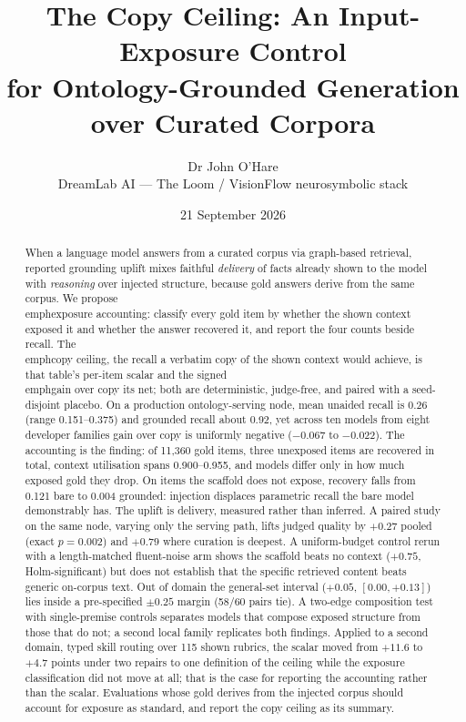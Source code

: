 \documentclass[10pt,twocolumn]{article}
\title{\vspace{-1.2cm}\bfseries The Copy Ceiling: An Input-Exposure Control\\
for Ontology-Grounded Generation over Curated Corpora}
\author{Dr John O'Hare\\ \small DreamLab AI --- The Loom / VisionFlow neurosymbolic stack}
\date{21 September 2026}
\begin{document}
\maketitle

\begin{abstract}
\noindent
When a language model answers from a curated corpus via graph-based retrieval, reported grounding uplift mixes faithful \emph{delivery} of facts already shown to the model with \emph{reasoning} over injected structure, because gold answers derive from the same corpus. We propose \\emph{exposure accounting}: classify every gold item by whether the shown context exposed it and whether the answer recovered it, and report the four counts beside recall. The \\emph{copy ceiling}, the recall a verbatim copy of the shown context would achieve, is that table's per-item scalar and the signed \\emph{gain over copy} its net; both are deterministic, judge-free, and paired with a seed-disjoint placebo. On a production ontology-serving node, mean unaided recall is 0.26 (range 0.151--0.375) and grounded recall about 0.92, yet across ten models from eight developer families gain over copy is uniformly negative ($-0.067$ to $-0.022$). The accounting is the finding: of 11{,}360 gold items, three unexposed items are recovered in total, context utilisation spans 0.900--0.955, and models differ only in how much exposed gold they drop. On items the scaffold does not expose, recovery falls from 0.121 bare to 0.004 grounded: injection displaces parametric recall the bare model demonstrably has. The uplift is delivery, measured rather than inferred. A paired study on the same node, varying only the serving path, lifts judged quality by $+0.27$ pooled (exact $p=0.002$) and $+0.79$ where curation is deepest. A uniform-budget control rerun with a length-matched fluent-noise arm shows the scaffold beats no context ($+0.75$, Holm-significant) but does not establish that the specific retrieved content beats generic on-corpus text. Out of domain the general-set interval ($+0.05$, $[0.00,+0.13]$) lies inside a pre-specified $\pm0.25$ margin (58/60 pairs tie). A two-edge composition test with single-premise controls separates models that compose exposed structure from those that do not; a second local family replicates both findings. Applied to a second domain, typed skill routing over 115 shown rubrics, the scalar moved from $+11.6$ to $+4.7$ points under two repairs to one definition of the ceiling while the exposure classification did not move at all; that is the case for reporting the accounting rather than the scalar. Evaluations whose gold derives from the injected corpus should account for exposure as standard, and report the copy ceiling as its summary.
\end{abstract}
\end{document}
